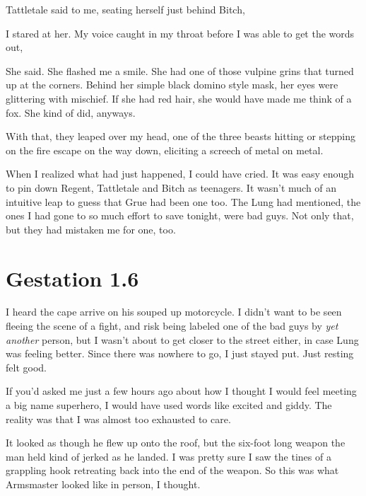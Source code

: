 Tattletale said to me, seating herself just behind Bitch, 

I stared at her. My voice caught in my throat before I was able to get the words out, 

 She said. She flashed me a smile. She had one of those vulpine grins that turned up at the corners. Behind her simple black domino style mask, her eyes were glittering with mischief. If she had red hair, she would have made me think of a fox. She kind of did, anyways.

With that, they leaped over my head, one of the three beasts hitting or stepping on the fire escape on the way down, eliciting a screech of metal on metal.

When I realized what had just happened, I could have cried. It was easy enough to pin down Regent, Tattletale and Bitch as teenagers. It wasn't much of an intuitive leap to guess that Grue had been one too. The  Lung had mentioned, the ones I had gone to so much effort to save tonight, were bad guys. Not only that, but they had mistaken me for one, too.


\chapter{Gestation 1.6}

I heard the cape arrive on his souped up motorcycle. I didn't want to be seen fleeing the scene of a fight, and risk being labeled one of the bad guys by {\em yet another} person, but I wasn't about to get closer to the street either, in case Lung was feeling better. Since there was nowhere to go, I just stayed put. Just resting felt good.

If you'd asked me just a few hours ago about how I thought I would feel meeting a big name superhero, I would have used words like excited and giddy. The reality was that I was almost too exhausted to care.

It looked as though he flew up onto the roof, but the six-foot long weapon the man held kind of jerked as he landed. I was pretty sure I saw the tines of a grappling hook retreating back into the end of the weapon. So this was what Armsmaster looked like in person, I thought.

